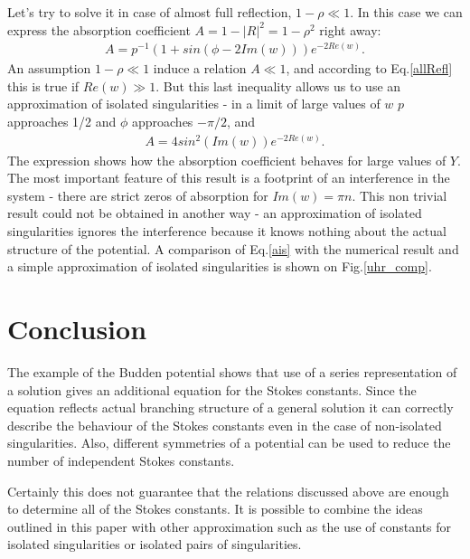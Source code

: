 \documentclass[aip,jmp,reprint]{revtex4-1}
\begin{document}
Let's try to solve it in case of almost full reflection, $1-\rho \ll 1$. In this case we can express the absorption coefficient $A=1-|R|^2=1-\rho^2$ right away:
\begin{eqnarray}
A=p^{-1}(1 + sin(\phi-2Im(w)))e^{-2Re(w)}. \label{allRefl}
\end{eqnarray}
An assumption $1-\rho \ll 1$ induce a relation $A \ll 1$, and according to Eq.\ref{allRefl} this is true if $Re(w) \gg 1$. But this last inequality allows us to use an approximation of isolated singularities - in a limit of large values of $w$ $p$ approaches 1/2 and $\phi$ approaches $-\pi/2$, and
\begin{eqnarray}
A=4sin^2(Im(w))e^{-2Re(w)}.   \label{ais}
\end{eqnarray}
The expression shows how the absorption coefficient behaves for large values of $Y$. The most important feature of this result is a footprint of an interference in the system - there are strict zeros of absorption for $Im(w)=\pi n$. This non trivial result could not be obtained in another way - an approximation of isolated singularities ignores the interference because it knows nothing about the actual structure of the potential. A comparison of Eq.\ref{ais} with the numerical result and a simple approximation of isolated singularities is shown on Fig.\ref{uhr_comp}.





\section{Conclusion \label{con}}
The example of the Budden potential shows that use of a series representation of a solution gives an additional equation for the Stokes constants. Since the equation reflects actual branching structure of a general solution it can correctly describe the behaviour of the Stokes constants even in the case of non-isolated singularities. Also, different symmetries of a potential can be used to reduce the number of independent Stokes constants.

Certainly this does not guarantee that the relations discussed above are enough to determine all of the Stokes constants. It is possible to combine the ideas outlined in this paper with other approximation such as the use of constants for isolated singularities or isolated pairs of singularities.
\end{document}
